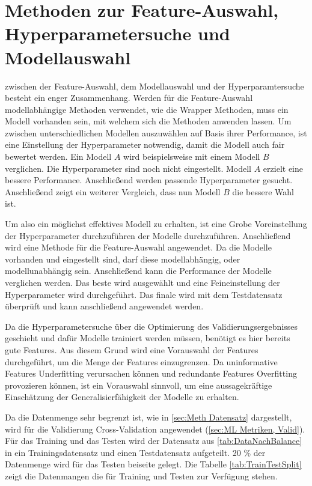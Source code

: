 \section{Methoden zur Feature-Auswahl, Hyperparametersuche und Modellauswahl} \label{sec:Meth FeatHypModSelect}
zwischen der Feature-Auswahl, dem Modellauswahl und der Hyperparamtersuche besteht ein enger Zusammenhang. Werden für die Feature-Auswahl modellabhängige Methoden verwendet, wie die Wrapper Methoden, muss ein Modell vorhanden sein, mit welchem sich die Methoden anwenden lassen. Um zwischen unterschiedlichen Modellen auszuwählen auf Basis ihrer Performance, ist eine Einstellung der Hyperparameter notwendig, damit die Modell auch fair bewertet werden. Ein Modell \(A\) wird beispielsweise mit einem Modell \(B\) verglichen. Die Hyperparameter sind noch nicht eingestellt. Modell \(A\) erzielt eine bessere Performance. Anschließend werden passende Hyperparameter gesucht. Anschließend zeigt ein weiterer Vergleich, dass nun Modell \(B\) die bessere Wahl ist. \par

Um also ein möglichst effektives Modell zu erhalten, ist eine Grobe Voreinstellung der Hyperparameter durchzuführen der Modelle durchzuführen. Anschließend wird eine Methode für die Feature-Auswahl angewendet. Da die Modelle vorhanden und eingestellt sind, darf diese modellabhängig, oder modellunabhängig sein. Anschließend kann die Performance der Modelle verglichen werden. Das beste wird ausgewählt und eine Feineinstellung der Hyperparameter wird durchgeführt. Das finale wird mit dem Testdatensatz überprüft und kann anschließend angewendet werden.\par

Da die Hyperparametersuche über die Optimierung des Validierungsergebnisses geschieht und dafür Modelle trainiert werden müssen, benötigt es hier bereits gute Features. Aus diesem Grund wird eine Vorauswahl der Features durchgeführt, um die Menge der Features einzugrenzen. Da uninformative Features Underfitting verursachen können und redundante Features Overfitting provozieren können, ist ein Vorauswahl sinnvoll, um eine aussagekräftige Einschätzung der Generalisierfähigkeit der Modelle zu erhalten. \par

Da die Datenmenge sehr begrenzt ist, wie in \autoref{sec:Meth Datensatz} dargestellt, wird für die Validierung Cross-Validation angewendet (\autoref{sec:ML Metriken, Valid}). Für das Training und das Testen wird der Datensatz aus \autoref{tab:DataNachBalance} in ein Trainingsdatensatz und einen Testdatensatz aufgeteilt. 20 \% der Datenmenge wird für das Testen beiseite gelegt. Die Tabelle \ref{tab:TrainTestSplit} zeigt die Datenmangen die für Training und Testen zur Verfügung stehen.


